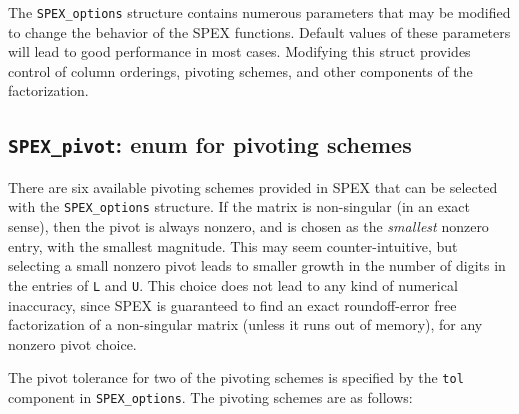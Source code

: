 \documentclass[12pt]{report}
\theoremstyle{definition}
\begin{document}
The \verb|SPEX_options| structure contains numerous parameters that may be
modified to change the behavior of the SPEX functions.  Default values of
these parameters will lead to good performance in most cases.  Modifying this
struct provides control of column orderings, pivoting schemes, and other
components of the factorization.

\cprotect\subsection{\verb|SPEX_pivot|: enum for pivoting schemes}
\label{ss:SPEX_pivot}

There are six available pivoting schemes provided in SPEX that can be
selected with the \verb|SPEX_options| structure.  If the matrix is non-singular
(in an exact sense), then the pivot is always nonzero, and is chosen as the
{\em smallest} nonzero entry, with the smallest magnitude.  This may seem
counter-intuitive, but selecting a small nonzero pivot leads to smaller growth
in the number of digits in the entries of \verb|L| and \verb|U|.  This choice
does not lead to any kind of numerical inaccuracy, since SPEX is guaranteed
to find an exact roundoff-error free factorization of a non-singular matrix
(unless it runs out of memory), for any nonzero pivot choice.

The pivot tolerance for two of the pivoting schemes is specified by the
\verb|tol| component in \verb|SPEX_options|.  The pivoting schemes are as
follows:
\end{document}
